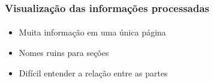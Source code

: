 \documentclass{beamer}
\begin{document}
\begin{frame}
  \frametitle{Visualização das informações processadas}
  \framesubtitle{}

  \begin{itemize}
    \item Muita informação em uma única página
    \vspace{.5cm}
    \item Nomes ruins para seções
    \vspace{.5cm}
    \item Difícil entender a relação entre as partes
  \end{itemize}
\end{frame}
\end{document}
